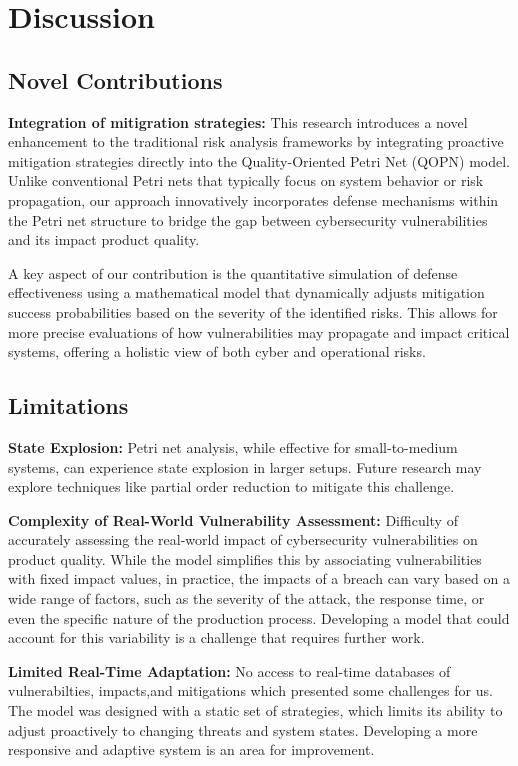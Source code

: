 \documentclass[conference]{IEEEtran}
\begin{document}
\section{Discussion}
\subsection{Novel Contributions}
\textbf{Integration of mitigration strategies:}
This research introduces a novel enhancement to the traditional risk analysis frameworks by integrating proactive mitigation strategies directly into the Quality-Oriented Petri Net (QOPN) model. Unlike conventional Petri nets that typically focus on system behavior or risk propagation, our approach innovatively incorporates defense mechanisms within the Petri net structure to bridge the gap between cybersecurity vulnerabilities and its impact product quality.  

A key aspect of our contribution is the quantitative simulation of defense effectiveness using a mathematical model that dynamically adjusts mitigation success probabilities based on the severity of the identified risks. This allows for more precise evaluations of how vulnerabilities may propagate and impact critical systems, offering a holistic view of both cyber and operational risks.

\subsection{Limitations}
\textbf{State Explosion:}
Petri net analysis, while effective for small-to-medium systems, can experience state explosion in larger setups. Future research may explore techniques like partial order reduction to mitigate this challenge.

\textbf{Complexity of Real-World Vulnerability Assessment:}
Difficulty of accurately assessing the real-world impact of cybersecurity vulnerabilities on product quality. While the model simplifies this by associating vulnerabilities with fixed impact values, in practice, the impacts of a breach can vary based on a wide range of factors, such as the severity of the attack, the response time, or even the specific nature of the production process. Developing a model that could account for this variability is a challenge that requires further work.

\textbf{Limited Real-Time Adaptation:}
No access to real-time databases of vulnerabilties, impacts,and mitigations which presented some challenges for us. The model was designed with a static set of strategies, which limits its ability to adjust proactively to changing threats and system states. Developing a more responsive and adaptive system is an area for improvement.
\end{document}
